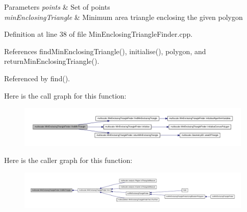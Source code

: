 \begin{DoxyParams}{\-Parameters}
{\em points} & \-Set of points \\
\hline
{\em min\-Enclosing\-Triangle} & \-Minimum area triangle enclosing the given polygon \\
\hline
\end{DoxyParams}


\-Definition at line 38 of file \-Min\-Enclosing\-Triangle\-Finder.\-cpp.



\-References find\-Min\-Enclosing\-Triangle(), initialise(), polygon, and return\-Min\-Enclosing\-Triangle().



\-Referenced by find().



\-Here is the call graph for this function\-:\nopagebreak
\begin{figure}[H]
\begin{center}
\leavevmode
\includegraphics[width=350pt]{classmultiscale_1_1MinEnclosingTriangleFinder_a1540deb145740cb2e73c7c76a9dd244f_cgraph}
\end{center}
\end{figure}




\-Here is the caller graph for this function\-:\nopagebreak
\begin{figure}[H]
\begin{center}
\leavevmode
\includegraphics[width=350pt]{classmultiscale_1_1MinEnclosingTriangleFinder_a1540deb145740cb2e73c7c76a9dd244f_icgraph}
\end{center}
\end{figure}


